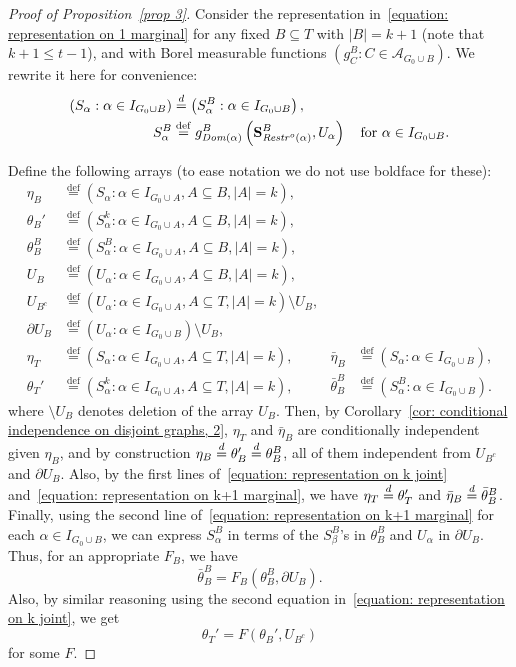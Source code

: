 \documentclass[AHL,Unicode,longabstracts,published]{cedram}
\newcommand{\alf}{\alpha}%
\newcommand*\bb{\beta}
\newcommand*{\defeq}{\stackrel{\mathrm{def}}{=}}
\renewcommand{\d}{\buildrel{d}\over{=}}
\newcommand*\srstr{\mathit{Restr}^o}
\newcommand*\dom{\mathit{Dom}}
\renewcommand{\AA}{\mathcal{A}}
\newcommand*\bS{\mathbf{S}}
\begin{document}
\begin{proof}[Proof of Proposition~\ref{prop 3}]
Consider the representation in~\eqref{equation: representation on 1 marginal} for any fixed $B \subseteq T$ with $|B|=k+1$ (note that $k+1\le t-1$), and with Borel measurable functions $(g^B_C:C \in \AA_{G_0 \cup B})$. We rewrite it here for convenience:
\begin{equation}\label{equation: representation on k+1 marginal}
\begin{aligned}
(S_\alf : \alf \in I_{G_0 \cup B}) & \d \left(S^B_\alf : \alf \in I_{G_0 \cup B}\right),
\\
S^B_\alf &
\defeq g^B_{\dom(\alf)}\left(\bS^B_{\srstr(\alf)}, U_\alf\right)\quad\text{for }\alf \in I_{G_0 \cup B}.
\end{aligned}
\end{equation}

Define the following arrays (to ease notation we do not use boldface for these):
\begin{align*}
\eta_B &
\defeq (S_\alf : \alf \in I_{G_0 \cup A}, A \subseteq B, |A|=k),
\\
\theta_B' &
\defeq \left(S^k_\alf : \alf \in I_{G_0 \cup A}, A \subseteq B, |A|=k\right),
\\
\theta_B^B&
\defeq \left(S^B_\alf : \alf \in I_{G_0 \cup A}, A \subseteq B, |A|=k\right),
\\[2ex] U_B &
\defeq(U_\alf : \alf \in I_{G_0 \cup A}, A \subseteq B, |A|=k),
\\
U_{B^c} &
\defeq (U_\alf : \alf \in I_{G_0 \cup A}, A \subseteq T, |A|=k) \setminus U_B,
\\
\partial U_B &
\defeq (U_\alf :\alf \in I_{G_0 \cup B}) \setminus U_B,
\\[2ex]
\eta_T &
\defeq (S_\alf :\alf \in I_{G_0 \cup A}, A \subseteq T, |A|=k), &
\bar\eta_B &
\defeq (S_\alf :\alf \in I_{G_0 \cup B}),
\\
\theta_T' &
\defeq \left(S^k_\alf : \alf \in I_{G_0 \cup A}, A \subseteq T, |A|=k\right), &
\bar\theta^B_B &
\defeq\left(S^B_\alf : \alf \in I_{G_0 \cup B}\right).
\end{align*}
where $\setminus U_B$ denotes deletion of the array $U_B$. Then, by Corollary~\ref{cor: conditional independence on disjoint graphs, 2}, $\eta_T$ and $\bar\eta_B$ are conditionally independent given $\eta_B $, and by construction $\eta_B \d \theta_B' \d \theta_B^B$, all of them independent from $U_{B^c}$ and $\partial U_B$. Also, by the first lines of~\eqref{equation: representation on k joint} and~\eqref{equation: representation on k+1 marginal}, we have $\eta_T \d \theta_T'$ and $\bar\eta_B \d \bar\theta^B_B$. Finally, using the second line of~\eqref{equation: representation on k+1 marginal} for each $\alf \in I_{G_0 \cup B}$, we can express $S^B_\alf$ in terms of the $S^B_\bb$'s in $\theta_B^B$ and $U_\alpha$ in $\partial U_B$. Thus, for an appropriate $F_B$, we have
\[
\bar\theta^B_B=F_B\left(\theta_B^B, \partial U_B\right).
\]
Also, by similar reasoning using the second equation in~\eqref{equation: representation on k joint}, we get
\[
\theta_T'=F(\theta_B', U_{B^c})
\]
for some $F$.


\end{proof}
\end{document}

